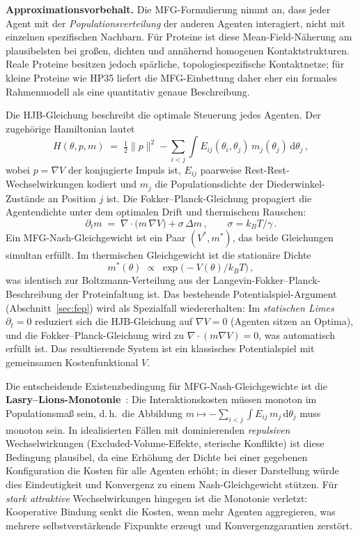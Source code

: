 \documentclass[12pt,a4paper]{article}
\theoremstyle{remark}
\begin{document}
\textbf{Approximationsvorbehalt.} Die MFG-Formulierung nimmt an, dass jeder Agent mit der \emph{Populationsverteilung} der anderen Agenten interagiert, nicht mit einzelnen spezifischen Nachbarn. Für Proteine ist diese Mean-Field-Näherung am plausibelsten bei großen, dichten und annähernd homogenen Kontaktstrukturen. Reale Proteine besitzen jedoch spärliche, topologiespezifische Kontaktnetze; für kleine Proteine wie HP35 liefert die MFG-Einbettung daher eher ein formales Rahmenmodell als eine quantitativ genaue Beschreibung.

Die HJB-Gleichung beschreibt die optimale Steuerung jedes Agenten. Der zugehörige Hamiltonian lautet
\begin{equation}\label{eq:mfg-hamiltonian}
  H(\theta,p,m) \;=\; \tfrac{1}{2}\|p\|^{2}
    - \sum_{i<j}\int E_{ij}(\theta_i,\theta_j)\,m_j(\theta_j)\,\mathrm{d}\theta_j\,,
\end{equation}
wobei $p=\nabla V$ der konjugierte Impuls ist, $E_{ij}$ paarweise Rest-Rest-Wechselwirkungen kodiert und $m_j$ die Populationsdichte der Diederwinkel-Zustände an Position $j$ ist. Die Fokker--Planck-Gleichung propagiert die Agentendichte unter dem optimalen Drift und thermischem Rauschen:
\begin{equation}\label{eq:mfg-fp}
  \partial_t m \;=\; \nabla\!\cdot\!\bigl(m\,\nabla V\bigr) + \sigma\,\Delta m\,,
  \qquad \sigma = k_B T / \gamma\,.
\end{equation}
Ein MFG-Nash-Gleichgewicht ist ein Paar $(V^{*},m^{*})$, das beide Gleichungen simultan erfüllt. Im thermischen Gleichgewicht ist die stationäre Dichte
\begin{equation}\label{eq:mfg-boltzmann}
  m^{*}(\theta) \;\propto\; \exp\!\bigl(-V(\theta)/k_B T\bigr)\,,
\end{equation}
was identisch zur Boltzmann-Verteilung aus der Langevin-Fokker--Planck-Beschreibung der Proteinfaltung ist. Das bestehende Potentialspiel-Argument (Abschnitt~\ref{sec:fep}) wird als Spezialfall wiedererhalten: Im \emph{statischen Limes} $\partial_t=0$ reduziert sich die HJB-Gleichung auf $\nabla V=0$ (Agenten sitzen an Optima), und die Fokker--Planck-Gleichung wird zu $\nabla\!\cdot(m\nabla V)=0$, was automatisch erfüllt ist. Das resultierende System ist ein klassisches Potentialspiel mit gemeinsamen Kostenfunktional $V$.

Die entscheidende Existenzbedingung für MFG-Nash-Gleichgewichte ist die \textbf{Lasry--Lions-Monotonie}~\cite{LasryLions2007}: Die Interaktionskosten müssen monoton im Populationsmaß sein, d.\,h.\ die Abbildung $m\mapsto -\sum_{i<j}\int E_{ij}\,m_j\,\mathrm{d}\theta_j$ muss monoton sein. In idealisierten Fällen mit dominierenden \emph{repulsiven} Wechselwirkungen (Excluded-Volume-Effekte, sterische Konflikte) ist diese Bedingung plausibel, da eine Erhöhung der Dichte bei einer gegebenen Konfiguration die Kosten für alle Agenten erhöht; in dieser Darstellung würde dies Eindeutigkeit und Konvergenz zu einem Nash-Gleichgewicht stützen. Für \emph{stark attraktive} Wechselwirkungen hingegen ist die Monotonie verletzt: Kooperative Bindung senkt die Kosten, wenn mehr Agenten aggregieren, was mehrere selbstverstärkende Fixpunkte erzeugt und Konvergenzgarantien zerstört.
\end{document}
